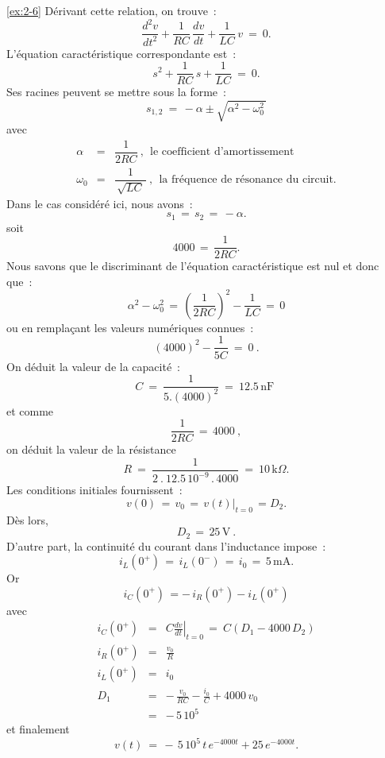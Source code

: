 \begin{solexercise}{\ref{ex:2-6}}
D\'erivant cette relation, on trouve~:
\[ \dfrac{d^2v}{dt^2} + \dfrac{1}{RC} \, \dfrac{dv}{dt} + \dfrac{1}{LC} \, v \: = \: 0. \]
L'\'equation caract\'eristique correspondante est~:
\[ s^2 + \dfrac{1}{RC} \, s + \dfrac{1}{LC} \: = \: 0. \]
Ses racines peuvent se mettre sous la forme~:
\[ s_{1,2} \: = \, -\alpha \pm \sqrt{\alpha^2 - \omega_0^2\,} \]
avec
\begin{eqnarray*}
	\alpha &=& \dfrac{1}{2RC}~, ~~\mbox{le coefficient d'amortissement}\\
	\omega_0 &=& \dfrac{1}{\, \sqrt{LC}\,}~, ~~\mbox{la fr\'equence de r\'esonance du circuit.}
\end{eqnarray*}
Dans le cas consid\'er\'e ici, nous avons~:
\[ s_1 \, =\,  s_2\, =\,  -\alpha. \]
soit
\[ 4000 \, =\,  \dfrac{1}{2RC}. \]
Nous savons que le discriminant de l'\'equation caract\'eristique est nul et donc que~:
\[ \alpha^2 - \omega_0^2 \, = \, \left( \dfrac{1}{2RC}\right)^2 - \dfrac{1}{LC} \, = \, 0 \]
ou en rempla\c{c}ant les valeurs num\'eriques connues~:
\[  (4000)^2 - \dfrac{1}{5C} \: = \: 0~. \]
On d\'eduit la valeur de la capacit\'e~:
\[ C \: = \: \dfrac{1}{5.(4000)^2} \: = \: 12.5\, \mbox{nF~} \]
et comme
\[ \dfrac{1}{2RC} \, = \, 4000~,\]
on d\'eduit la valeur de la r\'esistance
\[ R \: = \: \dfrac{1}{2\: . \: 12.5\, 10^{-9}\, . \, 4000} \: = \: 10\,\mbox{k}\Omega. \]
Les conditions initiales fournissent~:
\[ v(0) \, = \, v_0 \, = \, \left. v(t)\right|_{t=0} \,=  D_2. \]
D\`es lors,
\[ D_2 \, = \, 25\, \mbox{V}~. \]
D'autre part, la continuit\'e du courant dans l'inductance impose~:
\[ i_L(0^+) \, = \, i_L(0^-) \, = \, i_0 \, = \, 5\, \mbox{mA}.\]
Or
\[ i_C(0^+) \, = -\, i_R(0^+) - i_L(0^+) \]
avec
\begin{eqnarray*}
	i_C(0^+) &=& C \left. \frac{dv}{dt}\right|_{t=0} \, = \: C\left( D_1 - 4000\, D_2 \right)\\
	i_R(0^+) &=& \frac{v_0}{R}\\
	i_L(0^+) &=& i_0\\
	D_1 &=& -\, \frac{v_0}{RC} - \frac{i_0}{C} + 4000\, v_0\\
	&=& -\, 5\, 10^5
\end{eqnarray*}
et finalement
\[ v(t) \: = \, -\, 5\, 10^5\, t \, e^{-4000t} + 25\, e^{-4000t}. \]
\end{solexercise}

